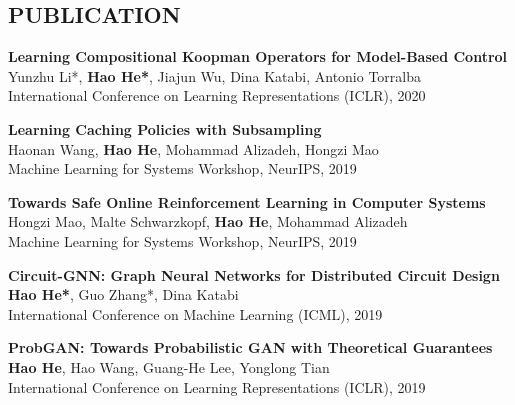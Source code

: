 \documentclass[margin]{res}
\newcommand{\Bullet}[1]{{\raisebox{0.25ex}{\tiny$\bullet$\ }}{#1}\\}
\begin{document}
\begin{resume}

\section{PUBLICATION}
\textbf{Learning Compositional Koopman Operators for Model-Based Control}\\
Yunzhu Li*, \textbf{Hao He*}, Jiajun Wu, Dina Katabi, Antonio Torralba\\
International Conference on Learning Representations (ICLR), 2020

\textbf{Learning Caching Policies with Subsampling}\\
Haonan Wang, \textbf{Hao He}, Mohammad Alizadeh, Hongzi Mao\\
Machine Learning for Systems Workshop, NeurIPS, 2019

\textbf{Towards Safe Online Reinforcement Learning in Computer Systems}\\
Hongzi Mao, Malte Schwarzkopf, \textbf{Hao He}, Mohammad Alizadeh\\
Machine Learning for Systems Workshop, NeurIPS, 2019

\textbf{Circuit-GNN: Graph Neural Networks for Distributed Circuit Design}\\
\textbf{Hao He*}, Guo Zhang*, Dina Katabi\\
International Conference on Machine Learning (ICML), 2019

\textbf{ProbGAN: Towards Probabilistic GAN with Theoretical Guarantees}\\
\textbf{Hao He}, Hao Wang, Guang-He Lee, Yonglong Tian\\
International Conference on Learning Representations (ICLR), 2019


\end{resume}
\end{document}

